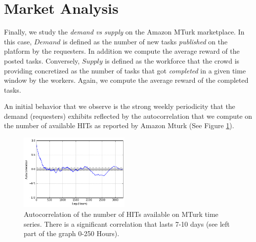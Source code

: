 \section{Market Analysis}
\label{sec:market}
Finally, we study the \emph{demand vs supply} on the Amazon MTurk marketplace.
In this case, $Demand$ is defined as the number of new tasks \emph{published} on the platform by the requesters.
In addition we compute the average reward of the posted tasks.
Conversely, $Supply$ is defined as the workforce that the crowd is providing concretized as the number of tasks that got \emph{completed} in a given time window by the workers.
Again, we compute the average reward of the completed tasks.

An initial behavior  that we observe is  the strong weekly periodicity that the demand (requesters) exhibits reflected by the autocorrelation that we compute on the number of available HITs as reported by Amazon Mturk (See Figure \ref{fig:autocorrelation1}).
\begin{figure}[tb]
	\centering
		\includegraphics[width=0.48\textwidth]{figures/autocorrelation_plot}
	\caption{Autocorrelation of the number of HITs available on MTurk time series.
There is a significant correlation that lasts 7-10 days (see left part of the graph 0-250 Hours).}
	\label{fig:autocorrelation1}
\end{figure}

